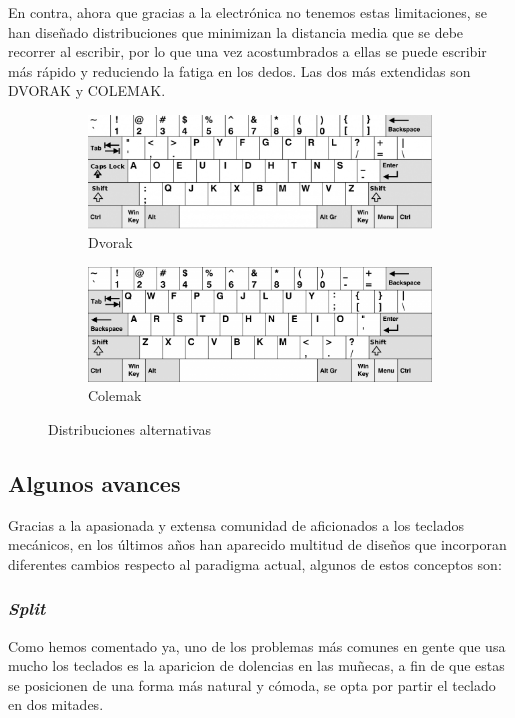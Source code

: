   En contra, ahora que gracias a la electrónica no tenemos estas limitaciones, se han diseñado distribuciones que minimizan la distancia media que se debe recorrer al escribir, por lo que una vez acostumbrados a ellas se puede escribir más rápido y reduciendo la fatiga en los dedos. Las dos más extendidas son DVORAK y COLEMAK. 
  \begin{figure}[H]
    \begin{subfigure}[b]{.5\textwidth}
      \centering
      \includegraphics[width=.6\textwidth]{images/dvorak}
      \caption{Dvorak}
    \end{subfigure} 
    \hfill
    \begin{subfigure}[b]{.5\textwidth}
      \centering
      \includegraphics[width=.6\textwidth]{images/colemak}
      \caption{Colemak}
    \end{subfigure}
    \caption{Distribuciones alternativas}
  \end{figure}

\subsection{Algunos avances}
Gracias a la apasionada y extensa comunidad de aficionados a los teclados mecánicos, en los últimos años han aparecido multitud de diseños que incorporan diferentes cambios respecto al paradigma actual, algunos de estos conceptos son:
  \subsubsection{\textit{Split}}
  Como hemos comentado ya, uno de los problemas más comunes en gente que usa mucho los teclados es la aparicion de dolencias en las muñecas, a fin de que estas se posicionen de una forma más natural y cómoda, se opta por partir el teclado en dos mitades.

